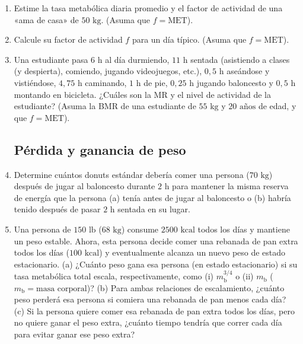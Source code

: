 \documentclass[12pt]{book}
\begin{document}
\begin{enumerate}
\item[6.83] Estime la tasa metabólica diaria promedio y el factor de actividad de una «ama de casa» de $50\text{ kg}$. (Asuma que $f = \text{MET}$).

\item[6.84] Calcule su factor de actividad $f$ para un día típico. (Asuma que $f = \text{MET}$).

\item[6.85] Una estudiante pasa $6\text{ h}$ al día durmiendo, $11\text{ h}$ sentada (asistiendo a clases (y despierta), comiendo, jugando videojuegos, etc.), $0{,}5\text{ h}$ aseándose y vistiéndose, $4{,}75\text{ h}$ caminando, $1\text{ h}$ de pie, $0{,}25\text{ h}$ jugando baloncesto y $0{,}5\text{ h}$ montando en bicicleta. ¿Cuáles son la MR y el nivel de actividad de la estudiante? (Asuma la BMR de una estudiante de $55\text{ kg}$ y $20\text{ años}$ de edad, y que $f = \text{MET}$).

\subsection*{Pérdida y ganancia de peso}

\item[6.86] Determine cuántos donuts estándar debería comer una persona ($70\text{ kg}$) después de jugar al baloncesto durante $2\text{ h}$ para mantener la misma reserva de energía que la persona (a) tenía antes de jugar al baloncesto o (b) habría tenido después de pasar $2\text{ h}$ sentada en su lugar.

\item[6.87] Una persona de $150\text{ lb}$ ($68\text{ kg}$) consume $2500\text{ kcal}$ todos los días y mantiene un peso estable. Ahora, esta persona decide comer una rebanada de pan extra todos los días ($100\text{ kcal}$) y eventualmente alcanza un nuevo peso de estado estacionario. (a) ¿Cuánto peso gana esa persona (en estado estacionario) si su tasa metabólica total escala, respectivamente, como (i) $m_{\text{b}}^{3/4}$ o (ii) $m_{\text{b}}$ ($m_{\text{b}} = \text{masa corporal}$)? (b) Para ambas relaciones de escalamiento, ¿cuánto peso perderá esa persona si comiera una rebanada de pan menos cada día? (c) Si la persona quiere comer esa rebanada de pan extra todos los días, pero no quiere ganar el peso extra, ¿cuánto tiempo tendría que correr cada día para evitar ganar ese peso extra?


\end{enumerate}
\end{document}
